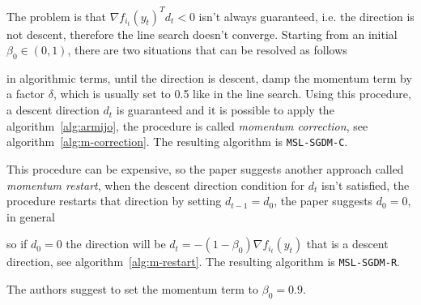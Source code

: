 The problem is that $\nabla f_{i_t}(y_t)^Td_t<0$ isn't always guaranteed, i.e. the direction is not descent, therefore the line search doesn't converge. Starting from an initial $\beta_0\in(0,1)$, there are two situations that can be resolved as follows
\begin{center}
\end{center}
in algorithmic terms, until the direction is descent, damp the momentum term by a factor $\delta$, which is usually set to \num{0.5} like in the line search. Using this procedure, a descent direction $d_t$ is guaranteed and it is possible to apply the algorithm~\ref{alg:armijo}, the procedure is called \emph{momentum correction}, see algorithm~\vref{alg:m-correction}. The resulting algorithm is \texttt{MSL-SGDM-C}.

This procedure can be expensive, so the paper suggests another approach called \emph{momentum restart}, when the descent direction condition for $d_t$ isn't satisfied, the procedure restarts that direction by setting $d_{t-1}=d_0$, the paper suggests $d_0=0$, in general
\begin{center}
\end{center}
so if $d_0=0$ the direction will be $d_t=-(1-\beta_0)\nabla f_{i_t}(y_t)$ that is a descent direction, see algorithm~\vref{alg:m-restart}. The resulting algorithm is \texttt{MSL-SGDM-R}.

The authors suggest to set the momentum term to $\beta_0=0.9$.
